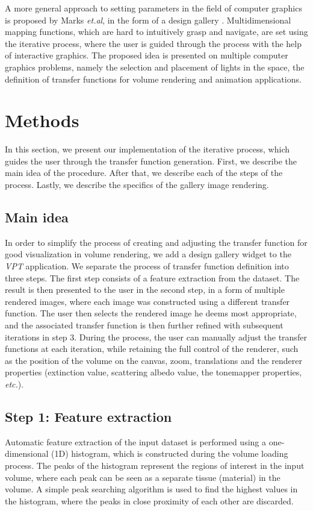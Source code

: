 \documentclass{egpubl-eurovis-short}
\begin{document}
A more general approach to setting parameters in the field of computer graphics is proposed by Marks \textit{et.al}, in the form of a design gallery \cite{marks1997design}. Multidimensional mapping functions, which are hard to intuitively grasp and navigate, are set using the iterative process, where the user is guided through the process with the help of interactive graphics. The proposed idea is presented on multiple computer graphics problems, namely the selection and placement of lights in the space, the definition of transfer functions for volume rendering and animation applications.

\section{Methods}
In this section, we present our implementation of the iterative process, which guides the user through the transfer function generation. First, we describe the main idea of the procedure. After that, we describe each of the steps of the process. Lastly, we describe the specifics of the gallery image rendering.

\subsection{Main idea}
In order to simplify the process of creating and adjusting the transfer function for good visualization in volume rendering, we add a design gallery widget to the \textit{VPT} application. We separate the process of transfer function definition into three steps. The first step consists of a feature extraction from the dataset. The result is then presented to the user in the second step, in a form of multiple rendered images, where each image was constructed using a different transfer function. The user then selects the rendered image he deems most appropriate, and the associated transfer function is then further refined with subsequent iterations in step 3. During the process, the user can manually adjust the transfer functions at each iteration, while retaining the full control of the renderer, such as the position of the volume on the canvas, zoom, translations and the renderer properties (extinction value, scattering albedo value, the tonemapper properties, \textit{etc.}).

\subsection{Step 1: Feature extraction}
Automatic feature extraction of the input dataset is performed using a one-dimensional (1D) histogram, which is constructed during the volume loading process. The peaks of the histogram represent the regions of interest in the input volume, where each peak can be seen as a separate tissue (material) in the volume. A simple peak searching algorithm is used to find the highest values in the histogram, where the peaks in close proximity of each other are discarded. 
\end{document}
